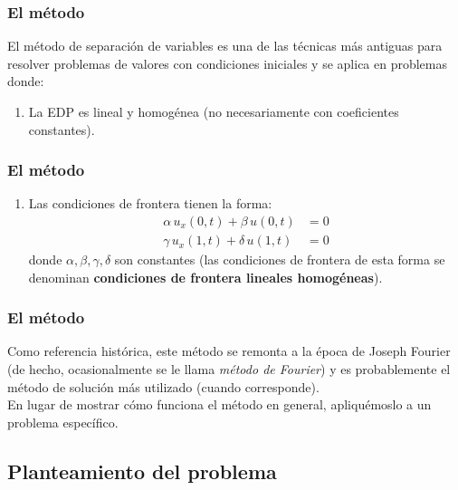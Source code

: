 \documentclass[12pt]{beamer}
\begin{document}
\begin{frame}
\frametitle{El método}
El método de separación de variables es una de las técnicas más antiguas para resolver problemas de valores con condiciones iniciales y se aplica en problemas donde:
\pause
{}
\begin{enumerate}
\item La EDP es lineal y homogénea (no necesariamente con coeficientes constantes).
\seti
\end{enumerate}
\end{frame}
\begin{frame}
\frametitle{El método}
\begin{enumerate}
\item Las condiciones de frontera tienen la forma:
\begin{align*}
\alpha \, u_{x} (0, t) + \beta \, u(0, t) &= 0 \\
\gamma \, u_{x} (1, t) + \delta \, u(1, t) &= 0
\end{align*}
donde $\alpha, \beta, \gamma, \delta$ son constantes (las condiciones de frontera de esta forma se denominan \textbf{condiciones de frontera lineales homogéneas}).
\end{enumerate}
\end{frame}
\begin{frame}
\frametitle{El método}
Como referencia histórica, este método se remonta a la época de Joseph Fourier (de hecho, ocasionalmente se le llama \emph{método de Fourier}) y es probablemente el método de solución más utilizado (cuando corresponde).
\\
\bigskip
\pause
En lugar de mostrar cómo funciona el método en general, apliquémoslo a un problema específico.
\end{frame}

\subsection{Planteamiento del problema}
\end{document}
